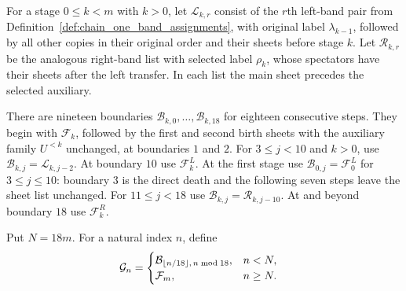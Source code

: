 \begin{definition}
    \label{def:chain_sweep_frame_path}
    \leanok
    For a stage $0\le k<m$ with $k>0$, let $\mathcal L_{k,r}$ consist of the $r$th left-band pair
    from Definition~\ref{def:chain_one_band_assignments}, with original
    label $\lambda_{k-1}$, followed by all other copies in their original
    order and their sheets before stage $k$.
    Let $\mathcal R_{k,r}$ be the analogous right-band list with selected
    label $\rho_k$, whose spectators have their sheets after the left
    transfer. In each list the main sheet precedes the selected auxiliary.

    There are nineteen boundaries $\mathcal B_{k,0},\ldots,\mathcal B_{k,18}$
    for eighteen consecutive steps. They begin with $\mathcal F_k$,
    followed by the first and second birth sheets with the auxiliary
    family $U^{<k}$ unchanged, at boundaries $1$ and $2$.
    For $3\le j<10$ and $k>0$, use $\mathcal B_{k,j}=\mathcal L_{k,j-2}$.
    At boundary $10$ use $\mathcal F_k^L$.
    At the first stage use $\mathcal B_{0,j}=\mathcal F_0^L$ for
    $3\le j\le10$: boundary $3$ is the direct death and the following
    seven steps leave the sheet list unchanged.
    For $11\le j<18$ use $\mathcal B_{k,j}=\mathcal R_{k,j-10}$.
    At and beyond boundary $18$ use $\mathcal F_k^R$.

    Put $N=18m$. For a natural index $n$, define
    \begin{align}
        \mathcal G_n & =
        \begin{cases}
            \mathcal B_{\lfloor n/18\rfloor,\,n\bmod18}, & n<N,    \\
            \mathcal F_m,                                & n\ge N.
        \end{cases}\notag
    \end{align}
\end{definition}

